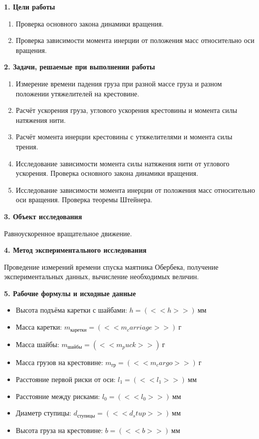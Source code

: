 \documentclass[14pt]{extreport}
\begin{document}


\vskip 15mm
\noindent\textbf{1. Цели работы}
\begin{enumerate}[label=\arabic*)]
    \item Проверка основного закона динамики вращения.
    \item Проверка зависимости момента инерции от положения масс относительно оси вращения.
\end{enumerate}


\noindent\textbf{2. Задачи, решаемые при выполнении работы}

\begin{enumerate}[label=\arabic*)]
    \item Измерение времени падения груза при разной массе груза и разном положении утяжелителей на крестовине.
    \item Расчёт ускорения груза, углового ускорения крестовины и момента силы натяжения нити.
    \item Расчёт момента инерции крестовины с утяжелителями и момента силы трения.
    \item Исследование зависимости момента силы натяжения нити от углового ускорения. Проверка основного закона динамики вращения.
    \item Исследование зависимости момента инерции от положения масс относительно оси вращения. Проверка теоремы Штейнера.
\end{enumerate}

\noindent\textbf{3. Объект исследования}

Равноускоренное вращательное движение.

\noindent\textbf{4. Метод экспериментального исследования}

Проведение измерений времени спуска маятника Обербека, получение экспериментальных данных, вычисление необходимых величин.

\noindent\textbf{5. Рабочие формулы и исходные данные}

\begin{itemize}
    \item Высота подъёма каретки с шайбами: $ h = (<<h>>)~\text{мм} $
    \item Масса каретки: $ m_\text{каретки} = (<<m_carriage>>)~\text{г} $
    \item Масса шайбы: $ m_\text{шайбы} = (<<m_puck>>)~\text{г} $
    \item Масса грузов на крестовине: $ m_\text{гр} = (<<m_cargo>>)~\text{г} $
    \item Расстояние первой риски от оси: $ l_1 = (<<l_1>>)~\text{мм} $
    \item Расстояние между рисками: $ l_0 = (<<l_0>>)~\text{мм} $
    \item Диаметр ступицы: $ d_\text{ступицы} = (<<d_stup>>)~\text{мм} $
    \item Высота груза на крестовине: $ b = (<<b>>)~\text{мм} $
\end{itemize}
\end{document}
